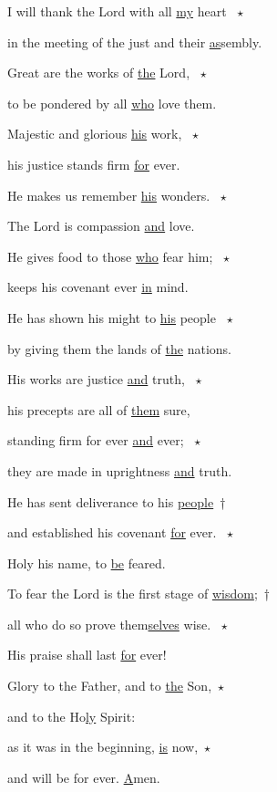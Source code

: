 \noindent I will thank the Lord with all \uline{my} heart ~$\star$~\nopagebreak

in the meeting of the just and their \uline{as}sembly.

\noindent Great are the works of \uline{the} Lord, ~$\star$~\nopagebreak

to be pondered by all \uline{who} love them.



\noindent Majestic and glorious \uline{his} work, ~$\star$~\nopagebreak

his justice stands firm \uline{for} ever.

\noindent He makes us remember \uline{his} wonders. ~$\star$~\nopagebreak

The Lord is compassion \uline{and} love.



\noindent He gives food to those \uline{who} fear him; ~$\star$~\nopagebreak

keeps his covenant ever \uline{in} mind.

\noindent He has shown his might to \uline{his} people ~$\star$~\nopagebreak

by giving them the lands of \uline{the} nations.



\noindent His works are justice \uline{and} truth, ~$\star$~\nopagebreak

his precepts are all of \uline{them} sure,

\noindent standing firm for ever \uline{and} ever; ~$\star$~\nopagebreak

they are made in uprightness \uline{and} truth.



\noindent He has sent deliverance to his \uline{people}~†~\nopagebreak

and established his covenant \uline{for} ever. ~$\star$~\nopagebreak

Holy his name, to \uline{be} feared.



\noindent To fear the Lord is the first stage of \uline{wisdom};~†~\nopagebreak

all who do so prove them\uline{selves} wise. ~$\star$~\nopagebreak

His praise shall last \uline{for} ever!



\noindent Glory to the Father, and to \uline{the} Son,~$\star$~\nopagebreak

and to the Ho\uline{ly} Spirit:

\noindent as it was in the beginning, \uline{is} now,~$\star$~\nopagebreak

and will be for ever. \uline{A}men.
